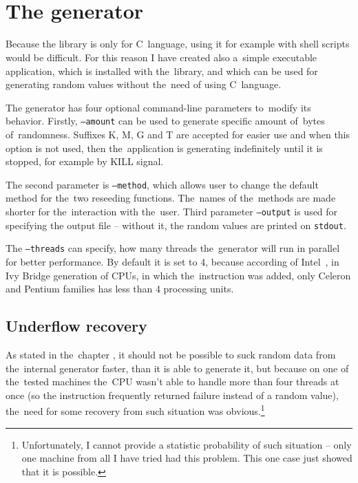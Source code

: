 \\


\\


\section{The generator} \label{sec:generator}

Because the library is only for C~language, using it for example with shell scripts would be difficult. For this reason I have created also a~simple executable application, which is installed with the~library, and which can be used for generating random values without the~need of using C~language.

The generator has four optional command-line parameters to~modify its behavior. Firstly, {\tt --amount} can be used to generate specific amount of~bytes of~randomness. Suffixes K, M, G and T are accepted for easier use and when this option is not used, then the~application is generating indefinitely until it is stopped, for example by KILL signal.

The second parameter is {\tt --method}, which allows user to change the default method  for the~two reseeding functions. The~names of the~methods are made shorter for the~interaction with the~user. Third parameter {\tt --output} is used for specifying the output file -- without it, the random values are printed on {\tt stdout}. 

The {\tt --threads} can specify, how many threads the~generator will run in parallel for better performance. By default it is set to 4, because according of Intel~\cite{IntelArk}, in Ivy Bridge generation of CPUs, in which the~instruction was added, only Celeron and Pentium families has less than 4 processing units.


\subsection{Underflow recovery}
As stated in the~chapter , it should not be possible to suck random data from the~internal generator faster, than it is able to generate it, but because on one of the~tested machines the~CPU wasn't able to handle more than four threads at once (so the instruction frequently returned failure instead of a random value), the~need for some recovery from such situation was obvious.\footnote{Unfortunately, I cannot provide a statistic probability of such situation -- only one machine from all I have tried had this problem. This one case just showed that it is possible.} 


